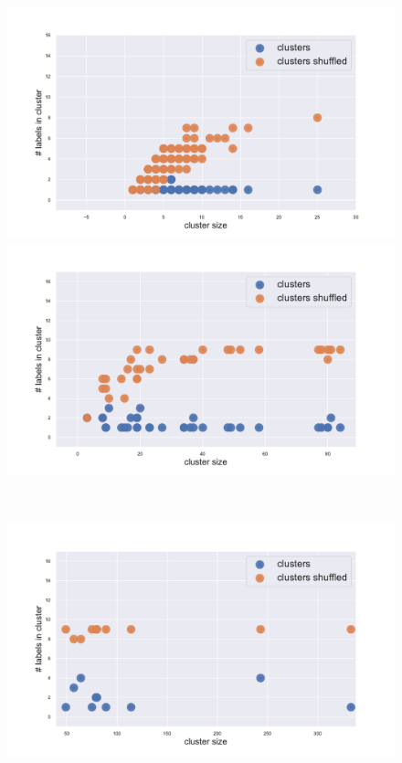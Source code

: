\begin{figure}[htb!]
    \centering
    \begin{minipage}{0.45\textwidth}
    \includegraphics[width=0.9\linewidth]{pictures/topic/gtex/oversigma_10tissue/shuffledcluster_shuffle_label_size_l1_primary_site.pdf}
    \end{minipage}
    \hspace{3mm}
    \begin{minipage}{0.45\textwidth}
    \includegraphics[width=0.9\linewidth]{pictures/topic/gtex/oversigma_10tissue/shuffledcluster_shuffle_label_size_l2_primary_site.pdf}
    \end{minipage}
    \\
    \begin{minipage}{0.45\textwidth}
    \includegraphics[width=0.9\linewidth]{pictures/topic/gtex/oversigma_10tissue/shuffledcluster_shuffle_label_size_l3_primary_site.pdf}

\end{minipage}
\end{figure}
